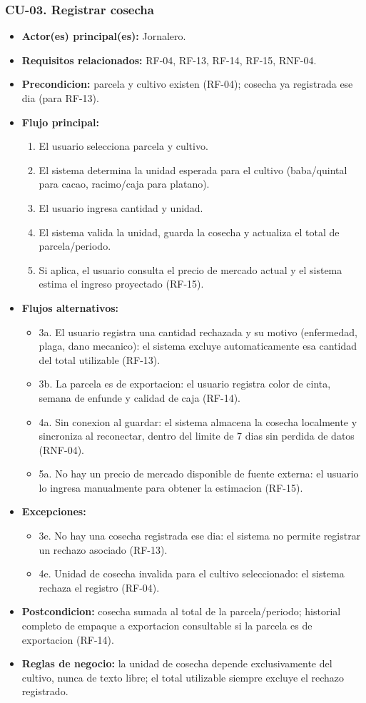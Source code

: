 \documentclass[11pt,a4paper]{article}
\begin{document}
\subsubsection{CU-03. Registrar cosecha}
\begin{itemize}
\item \textbf{Actor(es) principal(es):} Jornalero.
\item \textbf{Requisitos relacionados:} RF-04, RF-13, RF-14, RF-15, RNF-04.
\item \textbf{Precondicion:} parcela y cultivo existen (RF-04); cosecha ya registrada ese dia (para RF-13).
\item \textbf{Flujo principal:}
  \begin{enumerate}
  \item El usuario selecciona parcela y cultivo.
  \item El sistema determina la unidad esperada para el cultivo (baba/quintal para cacao, racimo/caja para platano).
  \item El usuario ingresa cantidad y unidad.
  \item El sistema valida la unidad, guarda la cosecha y actualiza el total de parcela/periodo.
  \item Si aplica, el usuario consulta el precio de mercado actual y el sistema estima el ingreso proyectado (RF-15).
  \end{enumerate}
\item \textbf{Flujos alternativos:}
  \begin{itemize}
  \item 3a. El usuario registra una cantidad rechazada y su motivo (enfermedad, plaga, dano mecanico): el sistema excluye automaticamente esa cantidad del total utilizable (RF-13).
  \item 3b. La parcela es de exportacion: el usuario registra color de cinta, semana de enfunde y calidad de caja (RF-14).
  \item 4a. Sin conexion al guardar: el sistema almacena la cosecha localmente y sincroniza al reconectar, dentro del limite de 7 dias sin perdida de datos (RNF-04).
  \item 5a. No hay un precio de mercado disponible de fuente externa: el usuario lo ingresa manualmente para obtener la estimacion (RF-15).
  \end{itemize}
\item \textbf{Excepciones:}
  \begin{itemize}
  \item 3e. No hay una cosecha registrada ese dia: el sistema no permite registrar un rechazo asociado (RF-13).
  \item 4e. Unidad de cosecha invalida para el cultivo seleccionado: el sistema rechaza el registro (RF-04).
  \end{itemize}
\item \textbf{Postcondicion:} cosecha sumada al total de la parcela/periodo; historial completo de empaque a exportacion consultable si la parcela es de exportacion (RF-14).
\item \textbf{Reglas de negocio:} la unidad de cosecha depende exclusivamente del cultivo, nunca de texto libre; el total utilizable siempre excluye el rechazo registrado.
\end{itemize}
\end{document}
